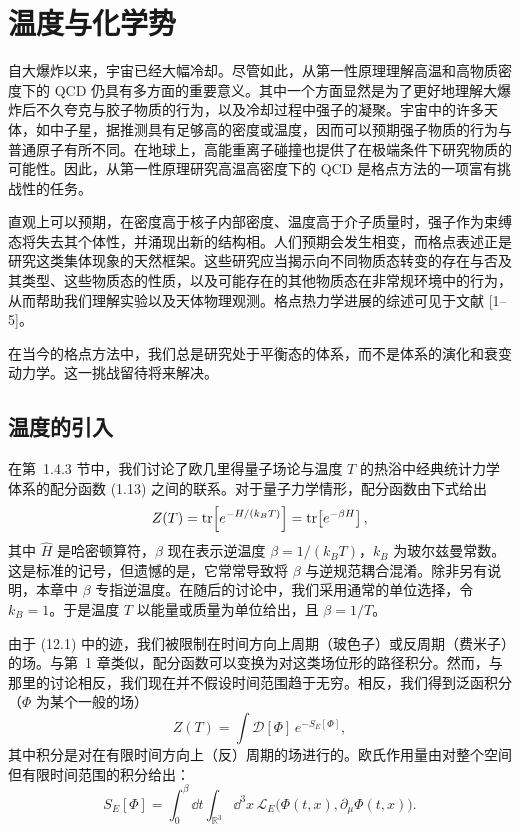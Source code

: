 
\chapter{温度与化学势}

自大爆炸以来，宇宙已经大幅冷却。尽管如此，从第一性原理理解高温和高物质密度下的 QCD 仍具有多方面的重要意义。其中一个方面显然是为了更好地理解大爆炸后不久夸克与胶子物质的行为，以及冷却过程中强子的凝聚。宇宙中的许多天体，如中子星，据推测具有足够高的密度或温度，因而可以预期强子物质的行为与普通原子有所不同。在地球上，高能重离子碰撞也提供了在极端条件下研究物质的可能性。因此，从第一性原理研究高温高密度下的 QCD 是格点方法的一项富有挑战性的任务。

直观上可以预期，在密度高于核子内部密度、温度高于介子质量时，强子作为束缚态将失去其个体性，并涌现出新的结构相。人们预期会发生相变，而格点表述正是研究这类集体现象的天然框架。这些研究应当揭示向不同物质态转变的存在与否及其类型、这些物质态的性质，以及可能存在的其他物质态在非常规环境中的行为，从而帮助我们理解实验以及天体物理观测。格点热力学进展的综述可见于文献 [1--5]。

在当今的格点方法中，我们总是研究处于平衡态的体系，而不是体系的演化和衰变动力学。这一挑战留待将来解决。

\section{温度的引入}

在第~1.4.3 节中，我们讨论了欧几里得量子场论与温度 $T$ 的热浴中经典统计力学体系的配分函数 (1.13) 之间的联系。对于量子力学情形，配分函数由下式给出
\begin{equation}
  Z(T) = \operatorname{tr}\!\left[e^{-H/(k_B T)}\right] = \operatorname{tr}\!\left[e^{-\beta H}\right],
\end{equation}
其中 $\hat{H}$ 是哈密顿算符，$\beta$ 现在表示逆温度 $\beta = 1/(k_B T)$，$k_B$ 为玻尔兹曼常数。这是标准的记号，但遗憾的是，它常常导致将 $\beta$ 与逆规范耦合混淆。除非另有说明，本章中 $\beta$ 专指逆温度。在随后的讨论中，我们采用通常的单位选择，令 $k_B = 1$。于是温度 $T$ 以能量或质量为单位给出，且 $\beta = 1/T$。

由于 (12.1) 中的迹，我们被限制在时间方向上周期（玻色子）或反周期（费米子）的场。与第~1 章类似，配分函数可以变换为对这类场位形的路径积分。然而，与那里的讨论相反，我们现在并不假设时间范围趋于无穷。相反，我们得到泛函积分（$\Phi$ 为某个一般的场）
\begin{equation}
  Z(T) = \int \mathcal{D}[\Phi]\,e^{-S_E[\Phi]},
\end{equation}
其中积分是对在有限时间方向上（反）周期的场进行的。欧氏作用量由对整个空间但有限时间范围的积分给出：
\begin{equation}
  S_E[\Phi] = \int_0^{\beta}\!\dd t \int_{\mathbb{R}^3}\!\dd^3 x\,
    \mathcal{L}_E\big(\Phi(t,x),\partial_\mu\Phi(t,x)\big).
\end{equation}

